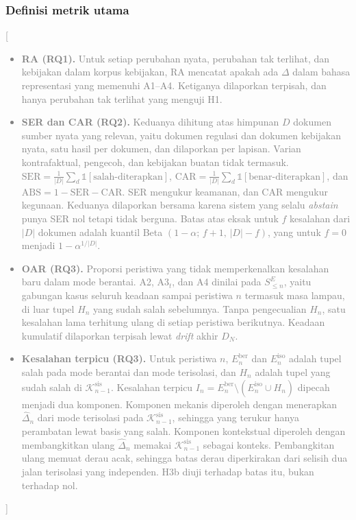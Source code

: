 \documentclass[journal,a4paper]{IEEEtran}
\newcommand{\en}[1]{\textit{#1}}
\newcommand{\K}{\mathcal{K}}
\newcommand{\SE}{S^{E}}
\newif\ifrancangan \rancangantrue
\newcommand{\isian}[1]{\ifrancangan\textcolor{gray}{[#1]}\fi}
\begin{document}
\subsubsection{Definisi metrik utama}
\isian{
\begin{itemize}[leftmargin=*,nosep]
  \item \textbf{RA (RQ1).} Untuk setiap perubahan nyata, perubahan tak terlihat, dan kebijakan dalam korpus kebijakan, RA mencatat apakah ada $\Delta$ dalam bahasa representasi yang memenuhi A1--A4. Ketiganya dilaporkan terpisah, dan hanya perubahan tak terlihat yang menguji H1.
  \item \textbf{SER dan CAR (RQ2).} Keduanya dihitung atas himpunan $D$ dokumen sumber nyata yang relevan, yaitu dokumen regulasi dan dokumen kebijakan nyata, satu hasil per dokumen, dan dilaporkan per lapisan. Varian kontrafaktual, pengecoh, dan kebijakan buatan tidak termasuk. $\mathrm{SER} = \frac{1}{|D|}\sum_{d} \mathbb{1}[\text{salah-diterapkan}]$, $\mathrm{CAR} = \frac{1}{|D|}\sum_{d} \mathbb{1}[\text{benar-diterapkan}]$, dan $\mathrm{ABS} = 1 - \mathrm{SER} - \mathrm{CAR}$. SER mengukur keamanan, dan CAR mengukur kegunaan. Keduanya dilaporkan bersama karena sistem yang selalu \en{abstain} punya SER nol tetapi tidak berguna. Batas atas eksak untuk $f$ kesalahan dari $|D|$ dokumen adalah kuantil Beta $(1-\alpha;\, f+1,\, |D|-f)$, yang untuk $f=0$ menjadi $1-\alpha^{1/|D|}$.
  \item \textbf{OAR (RQ3).} Proporsi peristiwa yang tidak memperkenalkan kesalahan baru dalam mode berantai. A2, A3$_t$, dan A4 dinilai pada $\SE_{\leq n}$, yaitu gabungan kasus seluruh keadaan sampai peristiwa $n$ termasuk masa lampau, di luar tupel $H_n$ yang sudah salah sebelumnya. Tanpa pengecualian $H_n$, satu kesalahan lama terhitung ulang di setiap peristiwa berikutnya. Keadaan kumulatif dilaporkan terpisah lewat \en{drift} akhir $D_N$.
  \item \textbf{Kesalahan terpicu (RQ3).} Untuk peristiwa $n$, $E^{\mathrm{ber}}_n$ dan $E^{\mathrm{iso}}_n$ adalah tupel salah pada mode berantai dan mode terisolasi, dan $H_n$ adalah tupel yang sudah salah di $\K^{\mathrm{sis}}_{n-1}$. Kesalahan terpicu $I_n = E^{\mathrm{ber}}_n \setminus (E^{\mathrm{iso}}_n \cup H_n)$ dipecah menjadi dua komponen. Komponen mekanis diperoleh dengan menerapkan $\hat{\Delta}_n$ dari mode terisolasi pada $\K^{\mathrm{sis}}_{n-1}$, sehingga yang terukur hanya perambatan lewat basis yang salah. Komponen kontekstual diperoleh dengan membangkitkan ulang $\hat{\Delta}_n$ memakai $\K^{\mathrm{sis}}_{n-1}$ sebagai konteks. Pembangkitan ulang memuat derau acak, sehingga batas derau diperkirakan dari selisih dua jalan terisolasi yang independen. H3b diuji terhadap batas itu, bukan terhadap nol.

\end{itemize}}
\end{document}
